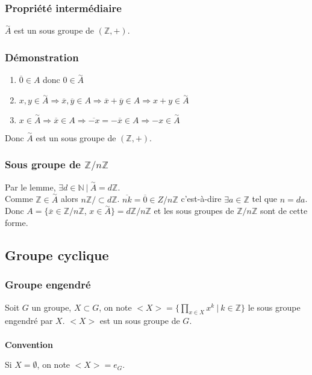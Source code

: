 \documentclass[a4paper,10pt]{book} %
\newcommand{\N}{\mathbb{N}}
\newcommand{\Z}{\mathbb{Z}}
\newcommand{\tq}{~|~}
\newcommand{\oversim}[1]{\overset{\sim}{#1}}
\begin{document}
\subsubsection{Propriété intermédiaire}
$\oversim{A}$ est un sous groupe de $(\Z,+)$.

\subsubsection{Démonstration}
\begin{enumerate}
\item $\overline{0}\in A$ donc $0\in \oversim{A}$
\item $x,y \in \oversim{A}\Rightarrow \overline{x},\overline{y}\in A \Rightarrow \overline{x}+\overline{y}\in A \Rightarrow x+y\in \oversim{A}$
\item $x\in \oversim{A}\Rightarrow \overline{x}\in A\Rightarrow \overline{-x}=-\overline{x}\in A\Rightarrow -x\in \oversim{A}$
\end{enumerate}
Donc $\oversim{A}$ est un sous groupe de $(\Z,+)$.

\subsubsection{Sous groupe de $\Z/n\Z$}
Par le lemme, $\exists d \in \N \tq \oversim{A}=d\Z$.\\
Comme $\Z\in \oversim{A}$ alors $n\Z/\subset d\Z$.
$\overline{nk}=\overline{0}\in Z/n\Z$ c'est-à-dire $\exists a\in \Z$ tel que $n=da$.\\

Donc $A=\{\overline{x}\in \Z/n\Z$, $x\in \oversim{A}\}=d\Z/n\Z$ et les sous groupes de $\Z/n\Z$ sont de cette forme.

\newpage

\subsection{Groupe cyclique}
\subsubsection{Groupe engendré}
Soit $G$ un groupe, $X\subset G$, on note $\displaystyle <X>=\{\prod_{x\in X}x^k\tq k\in \Z \}$ le sous groupe engendré par $X$. $<X>$ est un sous groupe de $G$.\\\\
\textbf{Convention}

Si $X=\emptyset$, on note $<X> = {e_G}$.
\end{document}

